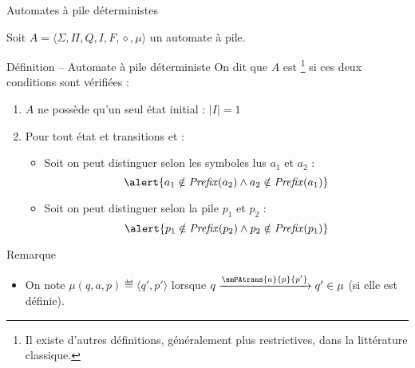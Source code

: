 
\begingroup

\begin{frame}{Automates à pile déterministes}

  Soit $A = \langle \Sigma, \Pi, Q, I, F, \diamond, \mu \rangle$ un automate à pile.

  \begin{block}{Définition -- Automate à pile déterministe}
    On dit que $A$ est \footnote[frame]{Il existe d'autres définitions, généralement plus restrictives, dans la littérature classique.} si ces deux conditions sont vérifiées : 
    \begin{enumerate}
    \item $A$ ne possède qu'un seul état initial : \alert{$|I| = 1$}
    \item Pour tout état  et transitions 
      et  :
      \begin{itemize}
      \item Soit on peut distinguer selon les symboles lus $a_1$ et $a_2$ :
        $$\alert{a_1 \notin \mathit{Prefix}(a_2) \land a_2 \notin \mathit{Prefix}(a_1)}$$
      \item Soit on peut distinguer selon la pile  $p_1$ et $p_2$ :
        $$\alert{p_1 \notin \mathit{Prefix}(p_2) \land p_2 \notin \mathit{Prefix}(p_1)}$$
      \end{itemize}
    \end{enumerate}
  \end{block}

  \begin{alertblock}{Remarque}
    \begin{itemize}
    \item \vspace{-1mm} On note $\mu(q, a, p) \eqdef \langle q', p'\rangle$ lorsque $q \xrightarrow{\footnotesize\smPAtrans{a}{p}{p'}} q' \in \mu$ (si elle est définie).
    \end{itemize}
  \end{alertblock}
\end{frame}


\endgroup
